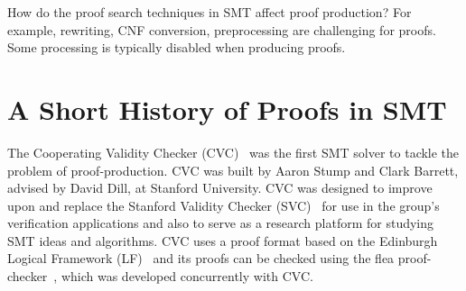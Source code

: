 \documentclass{llncs}
\begin{document}
How do the proof search techniques in SMT affect proof production?  For
example, rewriting, CNF conversion, preprocessing are challenging for proofs.
Some processing is typically disabled when producing proofs.











\section{A Short History of Proofs in SMT}
\label{sec:history}
The Cooperating Validity Checker (CVC)~\cite{SBD02} was the first SMT solver to
tackle the problem of proof-production.  CVC was built by Aaron Stump and Clark
Barrett, advised by David Dill, at Stanford University.  CVC was designed to
improve upon and replace the Stanford Validity Checker (SVC)~\cite{BDL96} for
use in the group's verification applications and also to serve as a research
platform for studying SMT ideas and algorithms.    CVC
uses a proof format based on the Edinburgh Logical Framework (LF)~\cite{HHP93}
and its proofs can be checked using the flea proof-checker~\cite{SBD02b,SD02}, which was
developed concurrently with CVC.
\end{document}
